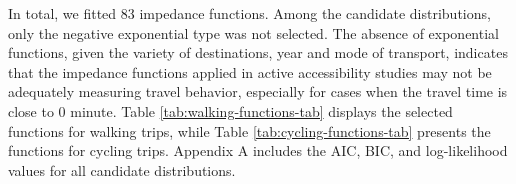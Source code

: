 \documentclass[preprint, 3p,
authoryear]{elsarticle} %
\begin{document}
In total, we fitted 83 impedance functions. Among the candidate
distributions, only the negative exponential type was not selected. The
absence of exponential functions, given the variety of destinations,
year and mode of transport, indicates that the impedance functions
applied in active accessibility studies may not be adequately measuring
travel behavior, especially for cases when the travel time is close to 0
minute. Table \ref{tab:walking-functions-tab} displays the selected
functions for walking trips, while Table \ref{tab:cycling-functions-tab}
presents the functions for cycling trips. Appendix A includes the AIC,
BIC, and log-likelihood values for all candidate distributions.

\begin{table}
\centering
\caption{\label{tab:selected-functions}\label{tab:walking-functions-tab}Impedance functions and AIC for walking trips.}
\centering
{}
\end{table}
\end{document}
